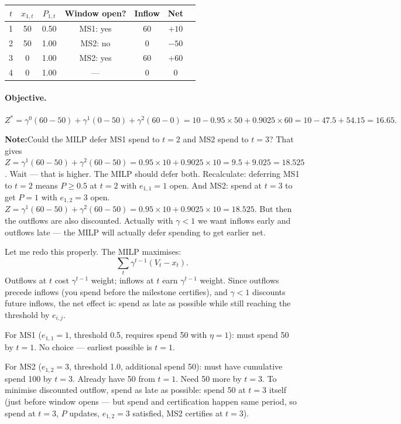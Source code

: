 \documentclass[11pt, a4paper]{article}
\newcommand{\NOTEH}{\textcolor{noteblu}{\bfseries Note:}\quad}
\begin{document}
\begin{center}
\begin{tabular}{ccccccc}
\toprule
$t$ & $x_{1,t}$ & $P_{1,t}$ & Window open? & Inflow & Net\\
\midrule
1 & 50 & 0.50 & MS1: yes & 60 & $+10$\\
2 & 50 & 1.00 & MS2: no  &  0 & $-50$\\
3 &  0 & 1.00 & MS2: yes & 60 & $+60$\\
4 &  0 & 1.00 & ---      &  0 & $0$\\
\bottomrule
\end{tabular}
\end{center}

\paragraph{Objective.}
\[
  Z^* = \gamma^0(60-50) + \gamma^1(0-50) + \gamma^2(60-0)
      = 10 - 0.95\times50 + 0.9025\times60
      = 10 - 47.5 + 54.15 = \mathbf{16.65}.
\]

\begin{notebox}
\NOTEH Could the MILP defer MS1 spend to $t=2$ and MS2 spend to $t=3$?
That gives $Z = \gamma^1(60-50)+\gamma^2(60-50) = 0.95\times10
+0.9025\times10=9.5+9.025=18.525$. Wait --- that is higher. The MILP
should defer both. Recalculate: deferring MS1 to $t=2$ means $P\geq0.5$
at $t=2$ with $e_{1,1}=1$ open. And MS2: spend at $t=3$ to get $P=1$
with $e_{1,2}=3$ open. $Z = \gamma^1(60-50)+\gamma^2(60-50)
=0.95\times10+0.9025\times10=18.525$. But then the outflows are also
discounted. Actually with $\gamma<1$ we want inflows early and outflows
late --- the MILP will actually defer spending to get earlier net.
\end{notebox}

Let me redo this properly. The MILP maximises:
\[
  \sum_t \gamma^{t-1}(V_t - x_t).
\]
Outflows at $t$ cost $\gamma^{t-1}$ weight; inflows at $t$ earn $\gamma^{t-1}$
weight. Since outflows precede inflows (you spend before the milestone
certifies), and $\gamma<1$ discounts future inflows, the net effect is:
spend as late as possible while still reaching the threshold by $e_{i,j}$.

For MS1 ($e_{1,1}=1$, threshold 0.5, requires spend 50 with $\eta=1$):
must spend 50 by $t=1$. No choice --- earliest possible is $t=1$.

For MS2 ($e_{1,2}=3$, threshold 1.0, additional spend 50):
must have cumulative spend 100 by $t=3$. Already have 50 from $t=1$.
Need 50 more by $t=3$. To minimise discounted outflow, spend as late
as possible: spend 50 at $t=3$ itself (just before window opens
--- but spend and certification happen same period, so spend at $t=3$,
$P$ updates, $e_{1,2}=3$ satisfied, MS2 certifies at $t=3$).
\end{document}

